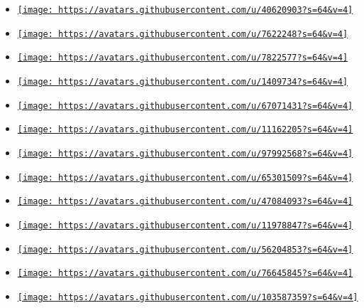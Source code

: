 \begin{itemize}
\tightlist
\item
  \href{https://github.com/figsoda}{\texttt{[image: https://avatars.githubusercontent.com/u/40620903?s=64\&v=4]}}
\item
  \href{https://github.com/loewenheim}{\texttt{[image: https://avatars.githubusercontent.com/u/7622248?s=64\&v=4]}}
\item
  \href{https://github.com/7sDream}{\texttt{[image: https://avatars.githubusercontent.com/u/7822577?s=64\&v=4]}}
\item
  \href{https://github.com/AlexanderEkdahl}{\texttt{[image: https://avatars.githubusercontent.com/u/1409734?s=64\&v=4]}}
\item
  \href{https://github.com/C284974}{\texttt{[image: https://avatars.githubusercontent.com/u/67071431?s=64\&v=4]}}
\item
  \href{https://github.com/Dragoncraft89}{\texttt{[image: https://avatars.githubusercontent.com/u/11162205?s=64\&v=4]}}
\item
  \href{https://github.com/Easyoakland}{\texttt{[image: https://avatars.githubusercontent.com/u/97992568?s=64\&v=4]}}
\item
  \href{https://github.com/KiruyaMomochi}{\texttt{[image: https://avatars.githubusercontent.com/u/65301509?s=64\&v=4]}}
\item
  \href{https://github.com/LaurenzV}{\texttt{[image: https://avatars.githubusercontent.com/u/47084093?s=64\&v=4]}}
\item
  \href{https://github.com/ModProg}{\texttt{[image: https://avatars.githubusercontent.com/u/11978847?s=64\&v=4]}}
\item
  \href{https://github.com/RafDevX}{\texttt{[image: https://avatars.githubusercontent.com/u/56204853?s=64\&v=4]}}
\item
  \href{https://github.com/Tom-stack3}{\texttt{[image: https://avatars.githubusercontent.com/u/76645845?s=64\&v=4]}}
\item
  \href{https://github.com/arctic-penguin}{\texttt{[image: https://avatars.githubusercontent.com/u/103587359?s=64\&v=4]}}

\end{itemize}
